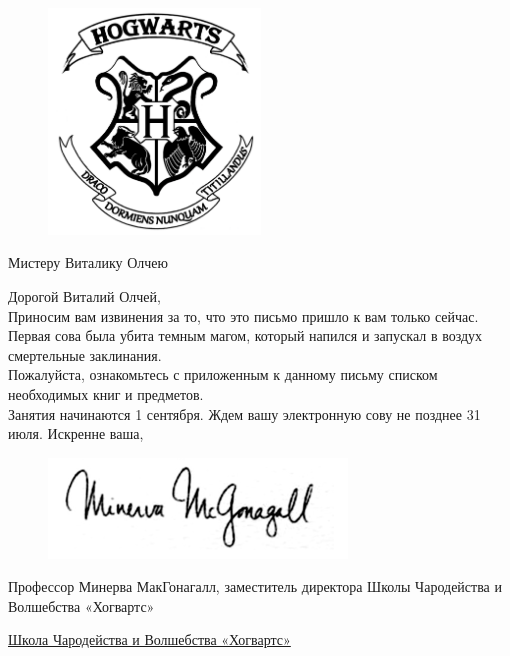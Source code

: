 \documentclass[14pt,a4paper, oneside]{report}
\begin{document}
\begin{titlepage}

\begin{figure}[h]
\vspace{-1cm}
\begin{center}
\includegraphics[height=6cm,keepaspectratio]{logo.png} 
\end{center}
\end{figure}

\vspace{1cm}

{\fontsize{12pt}{1}\selectfont Мистеру Виталику Олчею} 

\vspace{2.5cm}

Дорогой Виталий Олчей, \\

Приносим вам извинения за то, что это письмо пришло к вам только сейчас. Первая сова была убита темным магом, который напился и запускал в воздух смертельные заклинания. \\

Пожалуйста, ознакомьтесь с приложенным к данному письму списком необходимых книг и предметов.\\

Занятия начинаются 1 сентября. Ждем вашу электронную сову не позднее 31 июля.
\vfill
Искренне ваша,
\begin{figure}[H]
\includegraphics[scale=1]{signature}
\end{figure}
\vspace{-1cm}
Профессор Минерва МакГонагалл, заместитель директора Школы Чародейства и Волшебства «Хогвартс»
\begin{center}
\href{http://vhogwarts.ru}{{\fontsize{12pt}{1.33}\selectfont Школа Чародейства и Волшебства «Хогвартс»}}
\end{center}

\end{titlepage}
\end{document}
